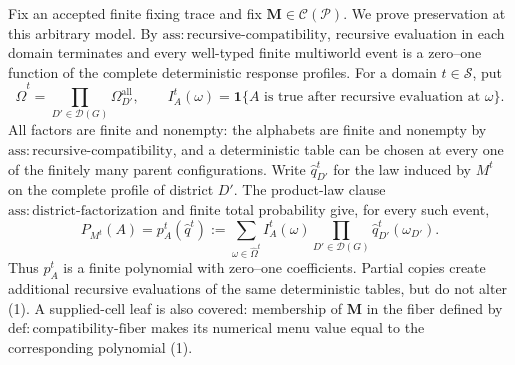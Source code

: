 Fix an accepted finite fixing trace and fix
\(\mathbf M\in\mathcal C(\mathcal P)\).  We prove preservation at this
arbitrary model.  By \(\mathrm{ass:recursive\text{-}compatibility}\), recursive
evaluation in each domain terminates and every well-typed finite multiworld
event is a zero--one function of the complete deterministic response profiles.
For a domain \(t\in\mathcal S\), put
\[
 \widehat\Omega^t=\prod_{D'\in\mathcal D(G)}
 \Omega_{D'}^{\mathrm{all}},
 \qquad
 I_A^t(\omega)=\mathbf 1\{A\text{ is true after recursive evaluation at }
 \omega\}.
\]
All factors are finite and nonempty: the alphabets are finite and nonempty by
\(\mathrm{ass:recursive\text{-}compatibility}\), and a deterministic table can
be chosen at every one of the finitely many parent configurations.  Write
\(\widehat q_{D'}^t\) for the law induced by \(M^t\) on the complete profile of
district \(D'\).  The product-law clause
\(\mathrm{ass:district\text{-}factorization}\) and finite total probability
give, for every such event,
\[
 P_{M^t}(A)
 =p_A^t(\widehat q^t)
 :=\sum_{\omega\in\widehat\Omega^t}
 I_A^t(\omega)
 \prod_{D'\in\mathcal D(G)}
 \widehat q_{D'}^t(\omega_{D'}).
 \tag{1}
\]
Thus \(p_A^t\) is a finite polynomial with zero--one coefficients.  Partial
copies create additional recursive evaluations of the same deterministic
tables, but do not alter (1).  A supplied-cell leaf is also covered: membership
of \(\mathbf M\) in the fiber defined by
\(\mathrm{def:compatibility\text{-}fiber}\) makes its numerical menu value
equal to the corresponding polynomial (1).

